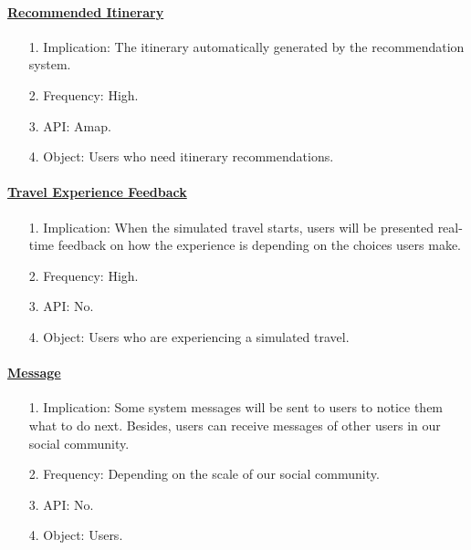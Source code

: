 \documentclass[10pt]{article}
\begin{document}
\paragraph{\underline{Recommended Itinerary}}
\begin{itemize}
  \item[1.] Implication: The itinerary automatically generated by the recommendation system.
  \item[2.] Frequency: High.
  \item[3.] API: Amap.  
  \item[4.] Object: Users who need itinerary recommendations. 
\end{itemize}

\paragraph{\underline{Travel Experience Feedback}}
\begin{itemize}
  \item[1.] Implication: When the simulated travel starts, users will be presented real-time feedback on how the experience is depending on the choices users make.
  \item[2.] Frequency: High.
  \item[3.] API: No.  
  \item[4.] Object: Users who are experiencing a simulated travel. 
\end{itemize}

\paragraph{\underline{Message}}
\begin{itemize}
  \item[1.] Implication: Some system messages will be sent to users to notice them what to do next. Besides, users can receive messages of other users in our social community.
  \item[2.] Frequency: Depending on the scale of our social community. 
  \item[3.] API: No. 
  \item[4.] Object: Users. 
\end{itemize}
\end{document}
